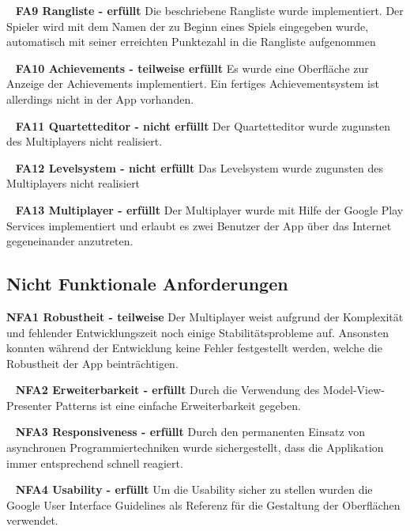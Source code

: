 \documentclass{scrartcl}
\begin{document}
\ \newline
\textbf{FA9 Rangliste - erfüllt} \newline
Die beschriebene Rangliste wurde implementiert. Der Spieler wird mit dem Namen
der zu Beginn eines Spiels eingegeben wurde, automatisch mit seiner erreichten
Punktezahl in die Rangliste aufgenommen

\ \newline
\textbf{FA10 Achievements - teilweise erfüllt} \newline
Es wurde eine Oberfläche zur Anzeige der Achievements implementiert. Ein
fertiges Achievementsystem ist allerdings nicht in der App vorhanden.

\ \newline
\textbf{FA11 Quartetteditor - nicht erfüllt} \newline
Der Quartetteditor wurde zugunsten des Multiplayers nicht realisiert.

\ \newline
\textbf{FA12 Levelsystem - nicht erfüllt} \newline
Das Levelsystem wurde zugunsten des Multiplayers nicht realisiert

\ \newline
\textbf{FA13 Multiplayer - erfüllt} \newline
Der Multiplayer wurde mit Hilfe der Google Play Services implementiert und
erlaubt es zwei Benutzer der App über das Internet gegeneinander anzutreten.

\subsection{Nicht Funktionale Anforderungen}

\textbf{NFA1 Robustheit - teilweise} \newline
Der Multiplayer weist aufgrund der Komplexität und fehlender Entwicklungszeit
noch einige Stabilitätsprobleme auf. Ansonsten konnten während der Entwicklung
keine Fehler festgestellt werden, welche die Robustheit der App beinträchtigen.

\ \newline
\textbf{NFA2 Erweiterbarkeit - erfüllt} \newline
Durch die Verwendung des Model-View-Presenter Patterns ist eine einfache
Erweiterbarkeit gegeben.

\ \newline
\textbf{NFA3 Responsiveness - erfüllt} \newline
Durch den permanenten Einsatz von asynchronen Programmiertechniken wurde
sichergestellt, dass die Applikation immer entsprechend schnell reagiert.

\ \newline
\textbf{NFA4 Usability - erfüllt} \newline
Um die Usability sicher zu stellen wurden die Google User Interface Guidelines
als Referenz für die Gestaltung der Oberflächen verwendet.
\end{document}

